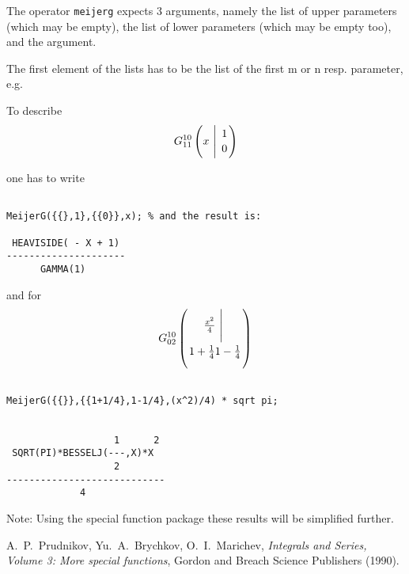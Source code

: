 The operator {\tt meijerg} expects 3 arguments, namely the 
list of upper parameters (which may be empty), the list of lower
parameters (which may be empty too), and the argument.

The first element of the lists has to be the list of the
first m or n resp. parameter, e.g.

To describe 
\begin{displaymath}
G_{1 1}^{1 0} \left( x \  \Bigg\vert \  {1 \atop 0} \right)
\end{displaymath}

one has to write 
\begin{verbatim}

MeijerG({{},1},{{0}},x); % and the result is:

 HEAVISIDE( - X + 1)
---------------------
      GAMMA(1)

\end{verbatim}
and for
\begin{displaymath}
G_{0 2}^{1 0} \left( \frac{x^2}{4} \  \Bigg\vert \ {} \atop  {1+ \frac{1}{4} }
{1-\frac{1}{4}} \right)
\end{displaymath}
\begin{verbatim}

MeijerG({{}},{{1+1/4},1-1/4},(x^2)/4) * sqrt pi;


                   1      2
 SQRT(PI)*BESSELJ(---,X)*X
                   2
----------------------------
             4

\end{verbatim}

Note: Using the special function package these results will be
simplified further.

\begin{thebibliography}{9}

 A.~P.~Prudnikov, Yu.~A.~Brychkov, O.~I.~Marichev,
{\em Integrals and Series, Volume 3: More special functions},
Gordon and Breach Science Publishers (1990).

\end{thebibliography}

